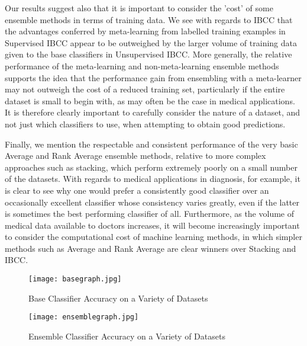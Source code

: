 \documentclass{bioinfo}
\begin{document}
\vspace{0.2cm}
\noindent
Our results suggest also that it is important to consider the 'cost' of some ensemble methods in terms of training data. We see with regards to IBCC that the advantages conferred by meta-learning from labelled training examples in Supervised IBCC appear to be outweighed by the larger volume of training data given to the base classifiers in Unsupervised IBCC. More generally, the relative performance of the meta-learning and non-meta-learning ensemble methods supports the idea that the performance gain from ensembling with a meta-learner may not outweigh the cost of a reduced training set, particularly if the entire dataset is small to begin with, as may often be the case in medical applications. It is therefore clearly important to carefully consider the nature of a dataset, and not just which classifiers to use, when attempting to obtain good predictions.

\vspace{0.2cm}
\noindent
Finally, we mention the respectable and consistent performance of the very basic Average and Rank Average ensemble methods, relative to more complex approaches such as stacking, which perform extremely poorly on a small number of the datasets. With regards to medical applications in diagnosis, for example, it is clear to see why one would prefer a consistently good classifier over an occasionally excellent classifier whose consistency varies greatly, even if the latter is sometimes the best performing classifier of all. Furthermore, as the volume of medical data available to doctors increases, it will become increasingly important to consider the computational cost of machine learning methods, in which simpler methods such as Average and Rank Average are clear winners over Stacking and IBCC.

\clearpage

\begin{figure}[p]
\centering
\texttt{[image: basegraph.jpg]}
\caption{Base Classifier Accuracy on a Variety of Datasets}
\label{fig:01}
\end{figure}

\clearpage

\begin{figure}[p]
\centering
\texttt{[image: ensemblegraph.jpg]}
\caption{Ensemble Classifier Accuracy on a Variety of Datasets}
\label{fig:02}
\end{figure}

\clearpage
\end{document}
